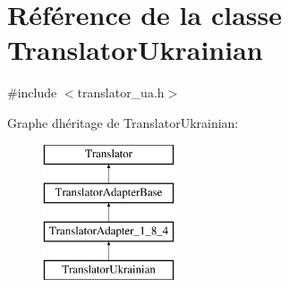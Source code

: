 \hypertarget{class_translator_ukrainian}{}\section{Référence de la classe Translator\+Ukrainian}
\label{class_translator_ukrainian}


{\ttfamily \#include $<$translator\+\_\+ua.\+h$>$}

Graphe d\textquotesingle{}héritage de Translator\+Ukrainian\+:\begin{figure}[H]
\begin{center}
\leavevmode
\includegraphics[height=4.000000cm]{class_translator_ukrainian}
\end{center}
\end{figure}
